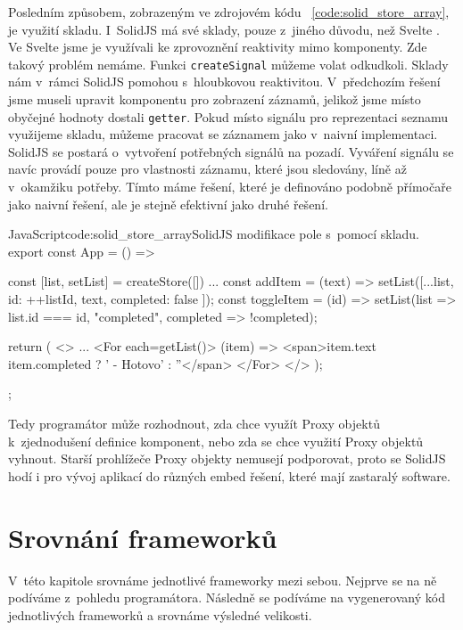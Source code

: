 \documentclass[
  master,
  program=ainf,
  tables=false,
  sourcecodes,
  glossaries,
  index
]{kidiplom}
\begin{document}
Posledním způsobem, zobrazeným ve zdrojovém kódu ~\ref{code:solid_store_array}, je využití skladu. 
I~SolidJS \cite{solidjs} má své sklady, pouze z~jiného důvodu, než Svelte \cite{svelte}. Ve Svelte \cite{svelte}
jsme je využívali ke zprovoznění reaktivity mimo komponenty. Zde takový problém nemáme. Funkci {\tt createSignal}
můžeme volat odkudkoli. Sklady nám v~rámci SolidJS \cite{solidjs} pomohou s~hloubkovou reaktivitou. V~předchozím řešení 
jsme museli upravit komponentu pro zobrazení záznamů, jelikož jsme místo obyčejné hodnoty dostali {\tt getter}.
Pokud místo signálu pro reprezentaci seznamu využijeme skladu, můžeme pracovat se záznamem jako v~naivní
implementaci. SolidJS \cite{solidjs} se postará o~vytvoření potřebných signálů na pozadí. Vyváření signálu se navíc provádí
pouze pro vlastnosti záznamu, které jsou sledovány, líně až v~okamžiku potřeby. Tímto máme řešení, které
je definováno podobně přímočaře jako naivní řešení, ale je stejně efektivní jako druhé řešení.

\begin{absolutelynopagebreak}
  \begin{kicode}{JavaScript}{code:solid_store_array}{SolidJS modifikace pole s~pomocí skladu.}
    export const App = () => {
      const [list, setList] = createStore([])
      ...
      const addItem = (text) => {
        setList([...list, { id: ++listId, text, completed: false }]);
      }
      const toggleItem = (id) => {
        setList(list => list.id === id, "completed", completed => !completed);
      }

      return (
        <>
          ...
          <For each={getList()}>
            {(item) => {<span>{item.text} {item.completed ? ' - Hotovo' : ''</span>} }}
          </For>
        </>
      );
    };
\end{kicode}
\end{absolutelynopagebreak}

Tedy programátor může rozhodnout, zda chce využít Proxy objektů k~zjednodušení definice komponent, nebo zda
se chce využití Proxy objektů vyhnout. Starší prohlížeče Proxy objekty nemusejí podporovat, proto se SolidJS \cite{solidjs}
hodí i pro vývoj aplikací do různých embed řešení, které mají zastaralý software.

\newpage
\section{Srovnání frameworků}
V~této kapitole srovnáme jednotlivé frameworky mezi sebou. Nejprve se na ně podíváme z~pohledu programátora.
Následně se podíváme na vygenerovaný kód jednotlivých frameworků a srovnáme výsledné velikosti.
\end{document}
